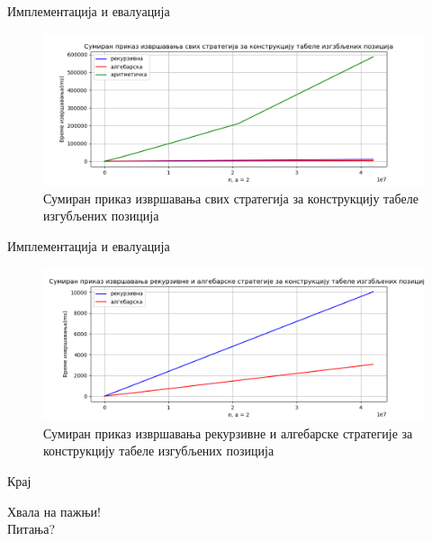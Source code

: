 \documentclass[10pt]{beamer}
\theoremstyle{remark}
\theoremstyle{definition}
\begin{document}
\begin{frame}{Имплементација и евалуација}
	\begin{figure}[H]
		\begin{center}
			\includegraphics[width=\textwidth]{../src/statistics/picture/all.png}
		\end{center}
		\caption{Сумиран приказ извршавања свих стратегија за конструкцију табеле изгубљених позиција}
	\end{figure}
\end{frame}
\begin{frame}{Имплементација и евалуација}	
	\begin{figure}[H]
		\begin{center}
			\includegraphics[width=\textwidth]{../src/statistics/picture/algebraicVSrecursive.png}
		\end{center}
		\caption{Сумиран приказ извршавања рекурзивне и алгебарске стратегије за конструкцију табеле изгубљених позиција}
	\end{figure}
\end{frame}

\begin{frame}{Крај}
	\begin{center}
		Хвала на пажњи!\\
		Питања?
	\end{center}
\end{frame}
\end{document}
